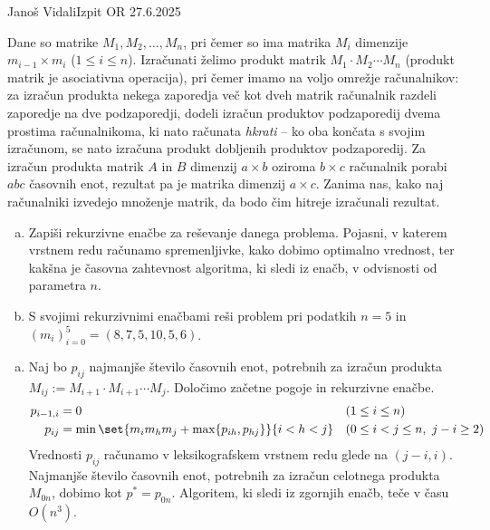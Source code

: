 \begin{naloga}{Janoš Vidali}{Izpit OR 27.6.2025}
\begin{vprasanje}
Dane so matrike $M_1, M_2, \dots, M_n$,
pri čemer so ima matrika $M_i$ dimenzije $m_{i-1} \times m_i$ ($1 \le i \le n$).
Izračunati želimo produkt matrik $M_1 \cdot M_2 \cdots M_n$
(produkt matrik je asociativna operacija),
pri čemer imamo na voljo omrežje računalnikov:
za izračun produkta nekega zaporedja več kot dveh matrik
računalnik razdeli zaporedje na dve podzaporedji,
dodeli izračun produktov podzaporedij dvema prostima računalnikoma,
ki nato računata {\em hkrati}
-- ko oba končata s svojim izračunom,
se nato izračuna produkt dobljenih produktov podzaporedij.
Za izračun produkta matrik $A$ in $B$
dimenzij $a \times b$ oziroma $b \times c$
računalnik porabi $abc$ časovnih enot,
rezultat pa je matrika dimenzij $a \times c$.
Zanima nas,
kako naj računalniki izvedejo množenje matrik,
da bodo čim hitreje izračunali rezultat.
\begin{enumerate}[(a)]
\item Zapiši rekurzivne enačbe za reševanje danega problema.
Pojasni, v katerem vrstnem redu računamo spremenljivke,
kako dobimo optimalno vrednost,
ter kakšna je časovna zahtevnost algoritma, ki sledi iz enačb,
v odvisnosti od parametra $n$.

\item S svojimi rekurzivnimi enačbami reši problem pri podatkih $n = 5$
in $(m_i)_{i=0}^5 = (8, 7, 5, 10, 5, 6)$.
\end{enumerate}
\end{vprasanje}

\begin{odgovor}
\begin{enumerate}[(a)]
\item Naj bo $p_{ij}$ najmanjše število časovnih enot,
potrebnih za izračun produkta $M_{ij} := M_{i+1} \cdot M_{i+1} \cdots M_j$.
Določimo začetne pogoje in rekurzivne enačbe.
\begin{align*}
p_{i-1, i} &= 0 && (1 \le i \le n) \\
p_{ij} &= \min\set{m_i m_h m_j + \max\{p_{ih}, p_{hj}\}}{i < h < j}
&& (0 \le i < j \le n, \ j - i \ge 2)
\end{align*}
Vrednosti $p_{ij}$ računamo v leksikografskem vrstnem redu glede na $(j-i, i)$.
Najmanjše število časovnih enot,
potrebnih za izračun celotnega produkta $M_{0n}$,
dobimo kot $p^* = p_{0n}$.
Algoritem, ki sledi iz zgornjih enačb, teče v času $O(n^3)$.


\end{enumerate}
\end{odgovor}
\end{naloga}
